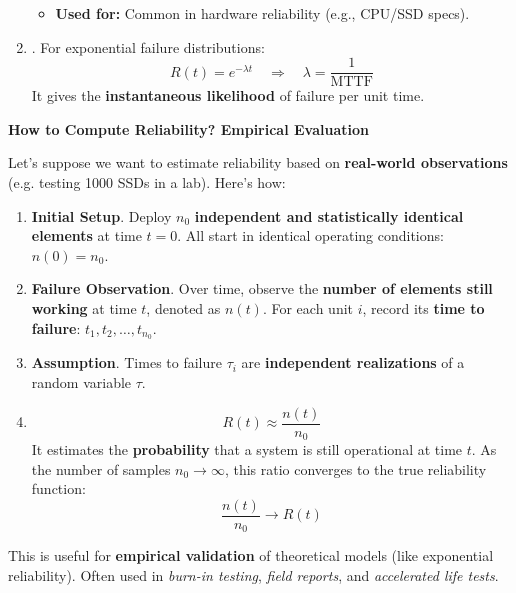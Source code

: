 \begin{enumerate}
\begin{itemize}
\begin{equation}
        \end{equation}
        \item[\textcolor{Green3}{\faIcon{tools}}] \textcolor{Green3}{\textbf{Used for:}} Common in hardware reliability (e.g., CPU/SSD specs).
    \end{itemize}
    \item {}. For exponential failure distributions:
    \begin{equation}
        R(t) = e^{-\lambda t} \quad \Rightarrow \quad \lambda = \frac{1}{\text{MTTF}}
    \end{equation}
    It gives the \textbf{instantaneous likelihood} of failure per unit time.
\end{enumerate}

\newpage

\begin{flushleft}
    \textcolor{Green3}{ \textbf{How to Compute Reliability? Empirical Evaluation}}
\end{flushleft}
Let's suppose we want to estimate reliability based on \textbf{real-world observations} (e.g. testing 1000 SSDs in a lab). Here's how:
\begin{enumerate}
    \item \textbf{Initial Setup}. Deploy $n_0$ \textbf{independent and statistically identical elements} at time $t = 0$. All start in identical operating conditions: $n\left(0\right) = n_0$.

    \item \textbf{Failure Observation}. Over time, observe the \textbf{number of elements still working} at time $t$, denoted as $n\left(t\right)$. For each unit $i$, record its \textbf{time to failure}: $t_1, t_2, \dots, t_{n_0}$.

    \item \textbf{Assumption}. Times to failure $\tau_i$ are \textbf{independent realizations} of a random variable $\tau$.

    \item {}
    \begin{equation}
        R(t) \approx \dfrac{n(t)}{n_0}
    \end{equation}
    It estimates the \textbf{probability} that a system is still operational at time $t$. As the number of samples $n_0 \rightarrow \infty$, this ratio converges to the true reliability function:
    \begin{equation}
        \dfrac{n(t)}{n_0} \longrightarrow R(t)
    \end{equation}
\end{enumerate}
This is useful for \textbf{empirical validation} of theoretical models (like exponential reliability). Often used in \emph{burn-in testing}, \emph{field reports}, and \emph{accelerated life tests}.

